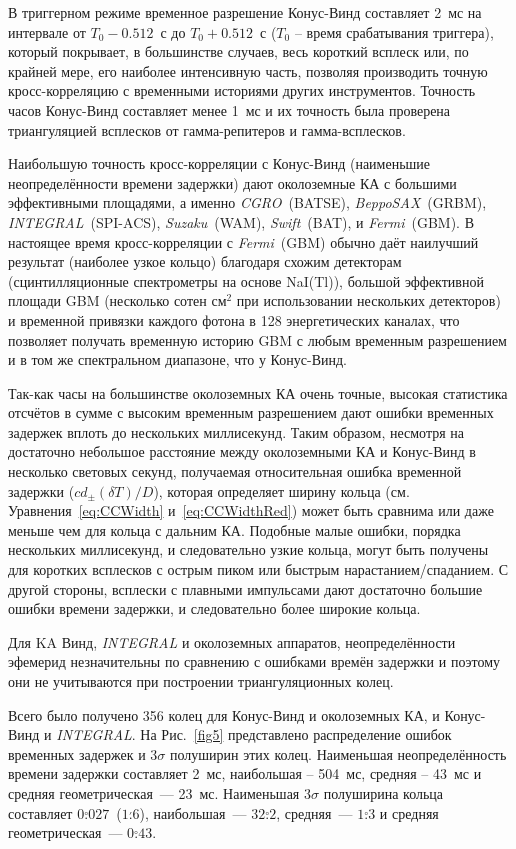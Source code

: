 В триггерном режиме временное разрешение Конус-Винд составляет 2~мс на интервале 
от $T_0-0.512$~с до $T_0+0.512$~с ($T_0$ -- время срабатывания триггера), 
который покрывает, в большинстве случаев, весь короткий всплеск или, по крайней 
мере, его наиболее интенсивную часть, позволяя производить точную кросс-корреляцию 
с временными историями других инструментов. Точность часов Конус-Винд составляет 
менее 1~мс и их точность была проверена триангуляцией всплесков от гамма-репитеров и гамма-всплесков.

Наибольшую точность кросс-корреляции с Конус-Винд (наименьшие неопределённости 
времени задержки) дают околоземные КА с большими эффективными площадями, 
а именно \textit{CGRO}~(BATSE), \textit{BeppoSAX}~(GRBM), \textit{INTEGRAL}~(SPI-ACS), 
\textit{Suzaku}~(WAM), \textit{Swift}~(BAT), и \textit{Fermi}~(GBM). 
В настоящее время кросс-корреляции с \textit{Fermi}~(GBM) обычно даёт наилучший 
результат (наиболее узкое кольцо) благодаря схожим детекторам (сцинтилляционные 
спектрометры на основе NaI(Tl)), большой эффективной площади GBM 
(несколько сотен см$^2$ при использовании нескольких детекторов) и временной 
привязки каждого фотона в 128 энергетических каналах, что позволяет получать 
временную историю GBM с любым временным разрешением и в том же спектральном диапазоне, 
что у Конус-Винд.

Так-как часы на большинстве околоземных КА очень точные, высокая статистика 
отсчётов в сумме с высоким временным разрешением дают ошибки временных задержек 
вплоть до нескольких миллисекунд. Таким образом, несмотря на достаточно небольшое 
расстояние между околоземными КА и Конус-Винд в несколько световых секунд, 
получаемая относительная ошибка временной задержки ($c d_{\pm}(\delta T)/D$), 
которая определяет ширину кольца (см. Уравнения~\ref{eq:CCWidth} и~\ref{eq:CCWidthRed}) 
может быть сравнима или даже меньше чем для кольца с дальним КА. Подобные малые ошибки, 
порядка нескольких миллисекунд, и следовательно узкие кольца, могут быть получены 
для коротких всплесков с острым пиком или быстрым нарастанием/спаданием. 
С другой стороны, всплески с плавными импульсами дают достаточно большие ошибки 
времени задержки, и следовательно более широкие кольца.

Для KA Винд, \textit{INTEGRAL} и околоземных аппаратов, неопределённости эфемерид 
незначительны по сравнению с ошибками времён задержки и поэтому они не учитываются 
при построении триангуляционных колец.

Всего было получено 356 колец для Конус-Винд и околоземных КА, и Конус-Винд и 
\textit{INTEGRAL}. На Рис.~\ref{fig5} представлено распределение ошибок временных 
задержек и $3\sigma$ полуширин этих колец. Наименьшая неопределённость времени 
задержки составляет 2~мс, наибольшая -- 504~мс, средняя -- 43~мс и средняя 
геометрическая~--- 23~мс. Наименьшая $3\sigma$ полуширина кольца составляет 
$0\overset{\circ}{.}027$~($1\overset{\prime}{.}6$), наибольшая~--- $32\overset{\circ}{.}2$, 
средняя~--- $1\overset{\circ}{.}3$ и средняя геометрическая~--- $0\overset{\circ}{.}43$.

